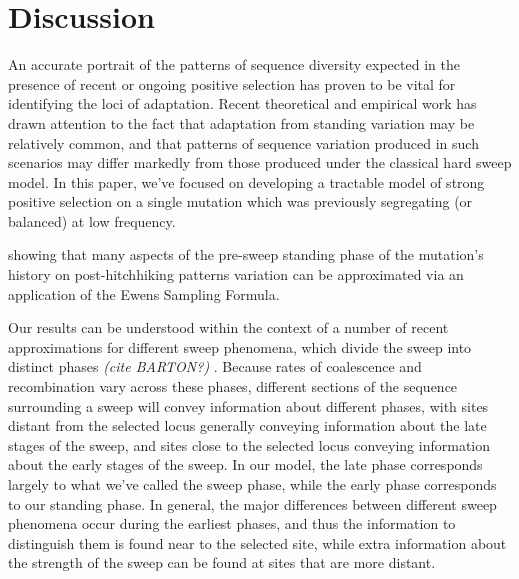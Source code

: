 \documentclass[a4paper,10pt]{article}
\newcommand{\gc}[1]{{\it \color{red} (#1)} }
\newcommand{\jb}[1]{{\it\color{blue} (#1)} }
\begin{document}
%
%
%
%
%

\section{Discussion}

An accurate portrait of the patterns of sequence diversity expected in the presence of recent or ongoing positive selection has proven to be vital for identifying the loci of adaptation. Recent theoretical and empirical work has drawn attention to the fact that adaptation from standing variation may be relatively common, and that patterns of sequence variation produced in such scenarios may differ markedly from those produced under the classical hard sweep model. In this paper, we've focused on developing a tractable model of strong positive selection on a single mutation which was previously segregating (or balanced) at low frequency. 

showing that many aspects of the pre-sweep standing phase of the mutation's history on post-hitchhiking patterns variation can be approximated via an application of the Ewens Sampling Formula.

Our results can be understood within the context of a number of recent approximations for different sweep phenomena, which divide the sweep into distinct phases \jb{cite BARTON?}. Because rates of coalescence and recombination vary across these phases, different sections of the sequence surrounding a sweep will convey information about different phases, with sites distant from the selected locus generally conveying information about the late stages of the sweep, and sites close to the selected locus conveying information about the early stages of the sweep. In our model, the late phase corresponds largely to what we've called the sweep phase, while the early phase corresponds to our standing phase. In general, the major differences between different sweep phenomena occur during the earliest phases, and thus the information to distinguish them is found near to the selected site, while extra information about the strength of the sweep can be found at sites that are more distant.
\end{document}
